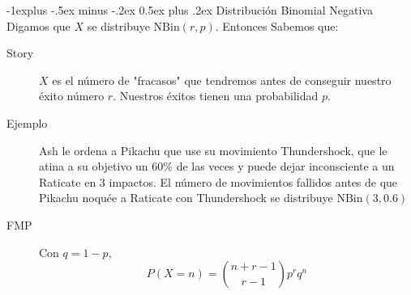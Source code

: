 \documentclass[12,landscape]{article}
\makeatletter
\newcommand{\NBin}{\textrm{NBin}}
\renewcommand{\subsection}{\@startsection{subsection}{2}{0mm}%
                                {-1explus -.5ex minus -.2ex}%
                                {0.5ex plus .2ex}%
                                {\normalfont\normalsize\bfseries}}
\makeatother
\begin{document}
\begin{multicols*}{3}
\subsection{Distribución Binomial Negativa} Digamos que $X$ se distribuye $\NBin(r, p)$. Entonces Sabemos que:
\begin{description}
    \item[Story] $X$ es el número de "fracasos" que tendremos antes de conseguir nuestro éxito número $r$. Nuestros éxitos tienen una probabilidad $p$.
    \item[Ejemplo] Ash le ordena a Pikachu que use su movimiento Thundershock, que le atina a su objetivo un 60\% de las veces y puede dejar inconsciente a un Raticate en 3 impactos. El número de movimientos fallidos antes de que Pikachu noquée a Raticate con Thundershock se distribuye $\NBin(3,0.6)$
    \item[FMP] Con $q = 1-p$, 
     \[P(X = n) = {n+r - 1 \choose r -1}p^rq^n\]
\end{description}


\end{multicols*}
\end{document}
